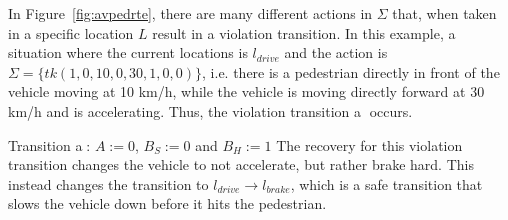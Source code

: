 \begin{example}
	In Figure~\ref{fig:avpedrte}, there are many different actions in $\Sigma$ that, when taken in a specific location $L$ result in a violation transition.
	In this example, a situation where the current locations is $l_{drive}$ and the action is $\Sigma = \{tk(1, 0, 10, 0, 30, 1, 0, 0)\}$, i.e. there is a pedestrian directly in front of the vehicle moving at 10 km/h, while the vehicle is moving directly forward at 30 km/h and is accelerating.
	Thus, the violation transition \textcircled{a} occurs.
	\squishlist
	\item Transition \textcircled{a}: $A := 0$, $B_S := 0$ and $B_H := 1$
	\squishend
	The recovery for this violation transition changes the vehicle to not accelerate, but rather brake hard.
	This instead changes the transition to $l_{drive} \rightarrow l_{brake}$, which is a safe transition that slows the vehicle down before it hits the pedestrian.
\end{example}

